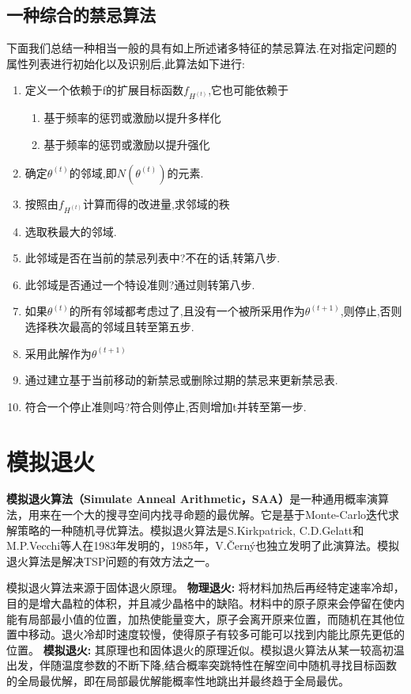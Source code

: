\documentclass[11pt,a4paper,oneside]{book}
\begin{document}
\subsection{一种综合的禁忌算法}
下面我们总结一种相当一般的具有如上所述诸多特征的禁忌算法.在对指定问题的属性列表进行初始化以及识别后,此算法如下进行:
\begin{enumerate}
	\item 定义一个依赖于f的扩展目标函数$ f_{H^{(t)}} $,它也可能依赖于
	\begin{enumerate}
		\item 基于频率的惩罚或激励以提升多样化
		\item 基于频率的惩罚或激励以提升强化
	\end{enumerate}
	\item 确定$ \theta^{(t)} $的邻域,即$ N(\theta^{(t)}) $的元素.
	\item 按照由$ f_{H^{(t)}} $计算而得的改进量,求邻域的秩
	\item 选取秩最大的邻域.
	\item 此邻域是否在当前的禁忌列表中?不在的话,转第八步.
	\item 此邻域是否通过一个特设准则?通过则转第八步.
	\item 如果$ \theta^{(t)} $的所有邻域都考虑过了,且没有一个被所采用作为$ \theta^{(t+1)} $,则停止,否则选择秩次最高的邻域且转至第五步.
	\item 采用此解作为$ \theta^{(t+1)} $
	\item 通过建立基于当前移动的新禁忌或删除过期的禁忌来更新禁忌表.
	\item 符合一个停止准则吗?符合则停止,否则增加t并转至第一步.
\end{enumerate}

\section{模拟退火}
\textbf{模拟退火算法（Simulate Anneal Arithmetic，SAA）}是一种通用概率演算法，用来在一个大的搜寻空间内找寻命题的最优解。它是基于Monte-Carlo迭代求解策略的一种随机寻优算法。模拟退火算法是S.Kirkpatrick, C.D.Gelatt和M.P.Vecchi等人在1983年发明的，1985年，V.Černý也独立发明了此演算法。模拟退火算法是解决TSP问题的有效方法之一。

模拟退火算法来源于固体退火原理。 \textbf{物理退火: }将材料加热后再经特定速率冷却，目的是增大晶粒的体积，并且减少晶格中的缺陷。材料中的原子原来会停留在使内能有局部最小值的位置，加热使能量变大，原子会离开原来位置，而随机在其他位置中移动。退火冷却时速度较慢，使得原子有较多可能可以找到内能比原先更低的位置。 \textbf{模拟退火:} 其原理也和固体退火的原理近似。模拟退火算法从某一较高初温出发，伴随温度参数的不断下降,结合概率突跳特性在解空间中随机寻找目标函数的全局最优解，即在局部最优解能概率性地跳出并最终趋于全局最优。
\end{document}
